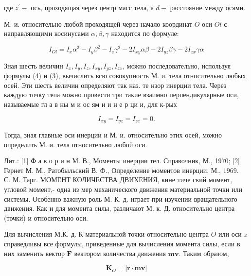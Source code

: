 \documentclass[10pt]{article}
\begin{document}
где $z^{\prime}-$ ось, проходящая через центр масс тела, а $d-$ расстояние между осями.



М. и. относительно любой проходящей через начало координат $O$ оси $O l$ с направляющими косинусами $\alpha, \beta, \gamma$ находится по формуле:



\[

I_{O l}=I_{x} \alpha^{2}-I_{y} \beta^{2}-I_{z} \gamma^{2}-2 I_{x y} \alpha \beta-2 I_{y z} \beta \gamma-2 I_{z x} \gamma \alpha

\]



Зная шесть величин $I_{x}, I_{y}, I_{z}, I_{x y}, I_{y z}, I_{z x}$, можно последовательно, используя формулы (4) и (3), вычислить всю совокупность М. и. тела относительно любых осей. Эти шесть величин определяют так наз. те нзор инерции тела. Через каждую точку тела можно провести три такие взаимно перпендикулярные оси, называемые гл а в ны м и ос ям и и н е р ци и, для к-рых



\[

I_{x y}=I_{y z}=I_{z x}=0 .

\]



Тогда, зная главные оси инерции и М. и. относительно этих осей, можно определить М. и. тела относительно любой оси.



Лит.: [1] Ф а в о р и н М. В., Моменты инерции тел. Справочник, М., 1970; [2] Гернет М. М., Ратобыльский В. Ф., Определение моментов инерции, М., $1969 . \quad$ С. М. Тарг. МОМЕНТ КОЛИЧЕСТВА ДВИХЕНИЯ, кине тиче ский момент, угловой момент,- одна из мер механического движения материальной точки или системы. Особенно важную роль М. К. д. играет при изучении вращательного движения. Как и для момента силы, различают М. к. Д. относительно центра (точки) и относительно оси.



Для вычисления М.К. д. К материальной точки относительно центра $O$ или оси $z$ справедливы все формулы, приведенные для вычисления момента силы, если в них заменить вектор $\boldsymbol{F}$ вектором количества движения $\boldsymbol{m} \boldsymbol{v}$. Таким образом,



\[

\boldsymbol{K}_{O}=|\boldsymbol{r} \cdot \boldsymbol{m v}|

\]
\end{document}
